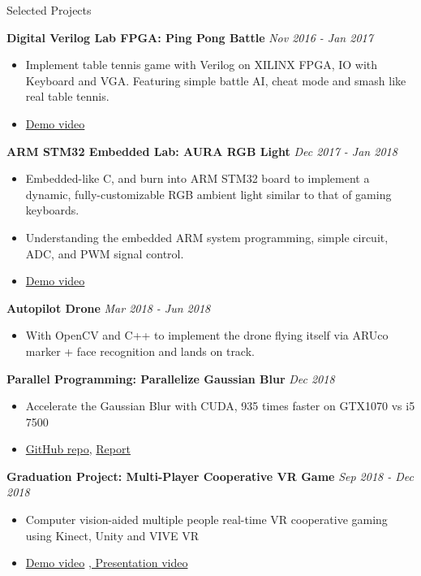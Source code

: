 \documentclass{resume} %
\begin{document}
\begin{rSection}{Selected Projects}

{\bf Digital Verilog Lab FPGA: Ping Pong Battle} \hfill {\em Nov 2016 - Jan 2017}
\begin{itemize}
    \item Implement table tennis game with Verilog on XILINX FPGA, IO with Keyboard and VGA. Featuring simple battle AI, cheat mode and smash like real table tennis.
    \item \href{https://www.youtube.com/watch?v=R4cgMN5uRBE}{Demo video}
\end{itemize}

{\bf ARM STM32 Embedded Lab: AURA RGB Light } \hfill {\em Dec 2017 - Jan 2018}
\begin{itemize}
    \item Embedded-like C, and burn into ARM STM32 board to implement a dynamic, fully-customizable RGB ambient light similar to that of gaming keyboards. 
    \item Understanding the embedded ARM system programming, simple circuit, ADC, and PWM signal control.
    \item \href{https://www.youtube.com/watch?v=FdnTKmdjxIc}{Demo video}
\end{itemize}

{\bf Autopilot Drone} \hfill {\em Mar 2018 - Jun 2018}
\begin{itemize}
\item With OpenCV and C++ to implement the drone flying itself via ARUco marker + face recognition and lands on track.
\end{itemize}

{\bf Parallel Programming: Parallelize Gaussian Blur} \hfill {\em Dec 2018}
\begin{itemize}
    \item Accelerate the Gaussian Blur with CUDA, 935 times faster on GTX1070 vs i5 7500
    \item \href{https://github.com/Alfons0329/Parallel_Programming_Fall_2018/tree/master/Final\%20Project}{GitHub repo}, \href{https://github.com/Alfons0329/Parallel_Programming_Fall_2018/blob/master/Final\%20Project/Team24_Final_Project_Report.pdf}{Report}
\end{itemize}

{\bf Graduation Project: Multi-Player Cooperative VR Game} \hfill {\em Sep 2018 - Dec 2018}
\begin{itemize}
    \item Computer vision-aided multiple people real-time VR cooperative gaming using Kinect, Unity and VIVE VR
    \item \href{https://www.youtube.com/watch?v=rYiFose7gZU}{Demo video} \href{https://youtu.be/Kfz1KYMKrtU}{, Presentation video}
\end{itemize}
\end{rSection}
\end{document}
